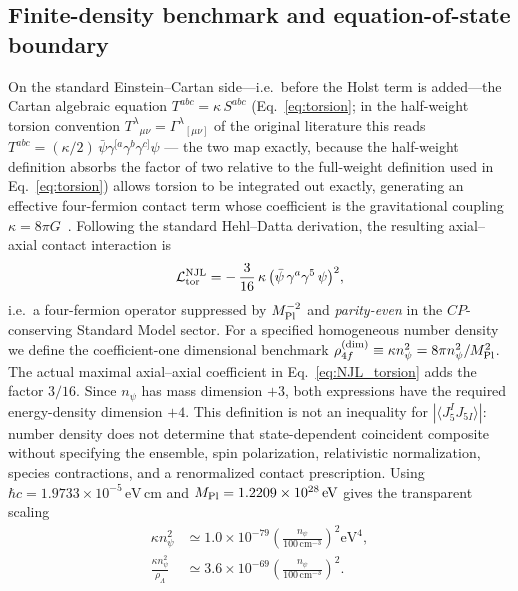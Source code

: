 \documentclass[aps,prd,twocolumn,superscriptaddress,showpacs,preprintnumbers,nofootinbib,longbibliography,floatfix]{revtex4-2}
\begin{document}
\subsection{Finite-density benchmark and equation-of-state boundary}
\label{sec:r1_njl}
On the standard Einstein--Cartan side---i.e.\ before the Holst term is
added---the Cartan algebraic equation $T^{abc} = \kappa\,S^{abc}$
(Eq.~\eqref{eq:torsion}; in the half-weight torsion convention
$T^\lambda{}_{\mu\nu} = \Gamma^\lambda{}_{[\mu\nu]}$ of the original
literature this reads $T^{abc} = (\kappa/2)\,
\bar\psi \gamma^{[a}\gamma^b\gamma^{c]} \psi$ --- the two map exactly,
because the half-weight definition absorbs the factor of two relative to the
full-weight definition used in Eq.~\eqref{eq:torsion}) allows torsion to
be integrated out exactly, generating an effective four-fermion
contact term whose coefficient is the gravitational coupling
$\kappa = 8\pi G$~\cite{Hehl1976,HehlDattaNJL1971}. Following the standard
Hehl--Datta derivation, the resulting axial--axial contact interaction is
\begin{equation}
\mathcal{L}^{\rm NJL}_{\rm tor}
= -\,\frac{3}{16}\,\kappa\,\bigl(\bar\psi\,\gamma^a\gamma^5\,\psi\bigr)^2,
\label{eq:NJL_torsion}
\end{equation}
i.e.\ a four-fermion operator suppressed by $M_{\rm Pl}^{-2}$ and
\emph{parity-even} in the $C\!P$-conserving Standard Model sector. For a
specified homogeneous number density we define the coefficient-one
dimensional benchmark
$\rho_{4f}^{(\mathrm{dim})}\equiv\kappa n_\psi^2
=8\pi n_\psi^2/M_{\rm Pl}^2$.
The actual maximal axial--axial coefficient in Eq.~\eqref{eq:NJL_torsion}
adds the factor $3/16$.  Since $n_\psi$ has mass dimension $+3$, both
expressions have the required energy-density dimension $+4$.
This definition is not an inequality for
$|\langle J_5^I J_{5I}\rangle|$: number density does not determine that
state-dependent coincident composite without specifying the ensemble, spin
polarization, relativistic normalization, species contractions, and a
renormalized contact prescription.
Using $\hbar c=1.9733\times10^{-5}\,\text{eV}\,\text{cm}$ and
$M_{\rm Pl}=1.2209\times10^{28}\,\text{eV}$ gives the transparent scaling
\begin{align}
\kappa n_\psi^2 &\simeq 1.0\times10^{-79}
\left(\frac{n_\psi}{100\,\mathrm{cm}^{-3}}\right)^2\!\mathrm{eV}^4,
\nonumber\\
\frac{\kappa n_\psi^2}{\rho_\Lambda}&\simeq3.6\times10^{-69}
\left(\frac{n_\psi}{100\,\mathrm{cm}^{-3}}\right)^2.
\end{align}
\end{document}

